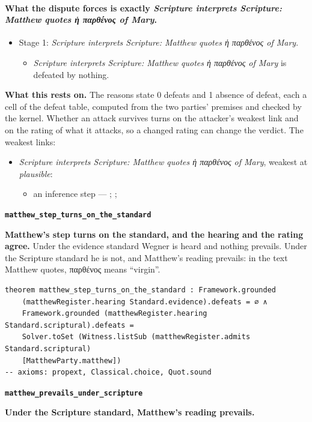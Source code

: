 \documentclass[11pt]{article}
\begin{document}
\paragraph{What the dispute forces is exactly \emph{Scripture interprets Scripture: Matthew quotes ἡ παρθένος of Mary}.}
\begin{itemize}
\item Stage 1: \emph{Scripture interprets Scripture: Matthew quotes ἡ παρθένος of Mary}.
\begin{itemize}
\item \emph{Scripture interprets Scripture: Matthew quotes ἡ παρθένος of Mary} is defeated by nothing.
\end{itemize}
\end{itemize}
\par\noindent\textbf{What this rests on.} The reasons state 0 defeats and 1 absence of defeat, each a cell of the defeat table, computed from the two parties' premises and checked by the kernel. Whether an attack survives turns on the attacker's weakest link and on the rating of what it attacks, so a changed rating can change the verdict. The weakest links:
\begin{itemize}
\item \emph{Scripture interprets Scripture: Matthew quotes ἡ παρθένος of Mary}, weakest at \emph{plausible}:
\begin{itemize}
\item an inference step --- \cite[I.ix]{westminster-confession-1647}; \cite[III.21.3]{irenaeus-against-heresies-180}; \cite[483]{wegner-virgin-births-2011}
\end{itemize}
\end{itemize}
\par\medskip\noindent\textbf{\texttt{matthew\_\allowbreak{}step\_\allowbreak{}turns\_\allowbreak{}on\_\allowbreak{}the\_\allowbreak{}standard}}\par\nobreak\noindent
\textbf{Matthew’s step turns on the standard, and the hearing and the rating agree.} Under the evidence standard Wegner is heard and nothing prevails. Under the Scripture standard he is not, and Matthew’s reading prevails: in the text Matthew quotes, παρθένος means “virgin”.

{\small\begin{verbatim}
theorem matthew_step_turns_on_the_standard : Framework.grounded
    (matthewRegister.hearing Standard.evidence).defeats = ∅ ∧
    Framework.grounded (matthewRegister.hearing Standard.scriptural).defeats =
    Solver.toSet (Witness.listSub (matthewRegister.admits Standard.scriptural)
    [MatthewParty.matthew])
-- axioms: propext, Classical.choice, Quot.sound
\end{verbatim}}
\par\medskip\noindent\textbf{\texttt{matthew\_\allowbreak{}prevails\_\allowbreak{}under\_\allowbreak{}scripture}}\par\nobreak\noindent
\textbf{Under the Scripture standard, Matthew’s reading prevails.}
\end{document}
